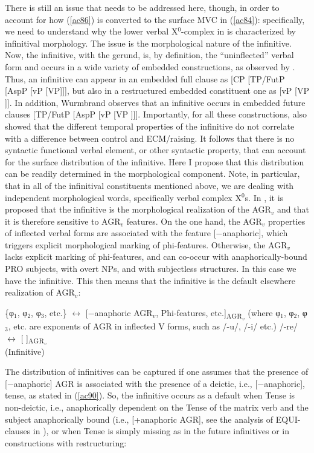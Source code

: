 \documentclass[output=paper]{langscibook}
\begin{document}
There is still an issue that needs to be addressed here, though, in order to account for how (\ref{ac86}) is converted to the surface MVC in (\ref{ac84}): specifically, we need to understand why the lower verbal X$^0$-complex in  is characterized by infinitival morphology. The issue is the morphological nature of the infinitive. Now, the infinitive, with the gerund, is, by definition, the “uninflected” verbal form and occurs in a wide variety of embedded constructions, as observed by \citet{wurmbrand2014a}.  Thus, an infinitive can appear in an embedded full clause as [CP [TP/FutP [AspP [vP [VP]]], but also in a restructured embedded constituent one as [vP [VP ]].  In addition, Wurmbrand observes that an infinitive occurs in embedded future clauses  [TP/FutP [AspP [vP [VP ]]]. Importantly, for all these constructions, \citet{wurmbrand2014a} also showed that the different temporal properties of the infinitive do not correlate with a difference between control and ECM/raising. It follows that there is no syntactic functional verbal element, or other syntactic property, that can account for the surface distribution of the infinitive. Here I propose that this distribution can be readily determined in the morphological component. Note, in particular, that in all of the infinitival constituents mentioned above, we are dealing with independent morphological words, specifically verbal complex X$^0$s. In \citet{calabrese1993a}, it is proposed that the infinitive is the morphological realization of the  AGR$_v$ and that it is therefore sensitive to  AGR$_v$ features. On the one hand, the  AGR$_v$ properties of inflected verbal forms are associated with the feature [−anaphoric], which triggers explicit morphological marking of phi-features.  Otherwise, the  AGR$_v$ lacks explicit marking of phi-features, and can co-occur with anaphorically-bound PRO subjects, with overt NPs, and with subjectless structures. In this case we have the infinitive. This then means that the infinitive is the default elsewhere realization of AGR$_v$:

\ea\label{ac89}
    \ea \label{ac89a}\{φ$_1$, φ$_2$, φ$_3$, etc.\} $\longleftrightarrow$ [−anaphoric  AGR$_v$, Phi-features, etc.]\textsubscript{AGR$_v$}
       (where φ$_1$, φ$_2$, φ$_3$, etc. are exponents of AGR in inflected V forms, such as /-u/, /-i/ etc.)
    \ex \label{ac89b}/-re/ $\longleftrightarrow$  [   ]\textsubscript{AGR$_v$}\\(Infinitive)
    \z
\z

The distribution of infinitives can be captured if one assumes that the presence of [−anaphoric] AGR is associated with the presence of a deictic, i.e., [−anaphoric], tense, as stated in (\ref{ac90}). So, the infinitive occurs as a default when Tense is non-deictic, i.e., anaphorically dependent on the Tense of the matrix verb and the subject anaphorically bound (i.e., [+anaphoric AGR], see the analysis of EQUI-clauses in \citet{calabrese1993a}), or when Tense is simply missing as in the future infinitives or in constructions with restructuring:
\end{document}
